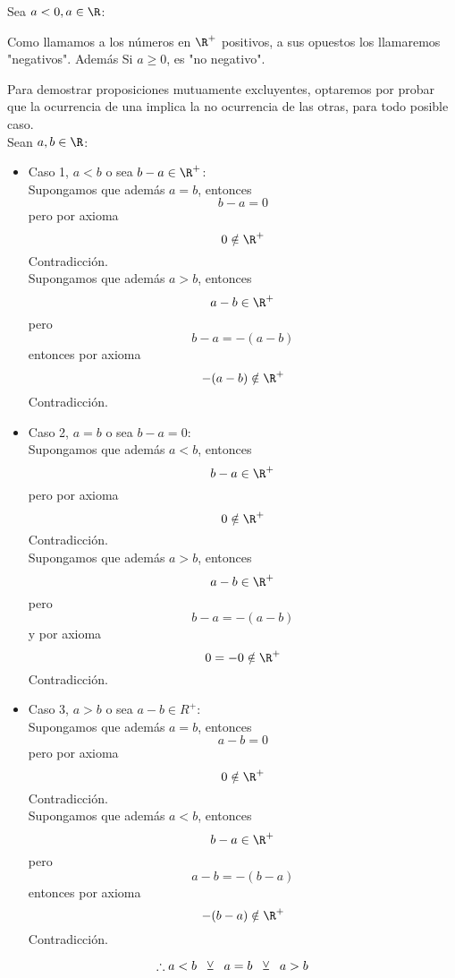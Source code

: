 \documentclass[10pt]{article}
\begin{document}
\begin{prf}[$a < 0 \Leftrightarrow -a > 0$]{}
	Sea $a < 0, a \in \R$:\\

\end{prf}

Como llamamos a los números en $\R^+$ positivos, a sus opuestos los llamaremos "negativos". Además Si $a \geq 0$, es "no negativo".

\begin{prf}{}
	Para demostrar proposiciones mutuamente excluyentes, optaremos por probar que la ocurrencia de una implica la no ocurrencia de las otras, para todo posible caso.\\
	Sean $a,b \in \R$:\\

	\begin{itemize}
		\item Caso 1, $a < b$ o sea $b - a \in \R^+$:\\
		Supongamos que además $a = b$, entonces
		$$b - a = 0$$
		pero por axioma
		$$0 \notin \R^+$$
		Contradicción.\\
		Supongamos que además $a > b$, entonces
		$$a - b \in \R^+$$
		pero
		$$b - a = -(a - b)$$
		entonces por axioma
		$$-(a - b) \notin \R^+$$
		Contradicción.\\
		\item Caso 2, $a = b$ o sea $b - a = 0$:\\
		Supongamos que además $a < b$, entonces
		$$b - a \in \R^+$$
		pero por axioma
		$$0 \notin \R^+$$
		Contradicción.\\
		Supongamos que además $a > b$, entonces
		$$a - b \in \R^+$$
		pero
		$$b - a = -(a - b)$$
		y por axioma
		$$0 = -0 \notin \R^+$$
		Contradicción.\\
		\item Caso 3, $a > b$ o sea $a - b \in R^+$:\\
		Supongamos que además $a = b$, entonces
		$$a - b = 0$$
		pero por axioma
		$$0 \notin \R^+$$
		Contradicción.\\
		Supongamos que además $a < b$, entonces
		$$b - a \in \R^+$$
		pero
		$$a - b = -(b - a)$$
		entonces por axioma
		$$-(b - a) \notin \R^+$$
		Contradicción.\\
	\end{itemize}
	$$\therefore a < b\hspace{2mm}\veebar\hspace{2mm} a = b \hspace{2mm}\veebar\hspace{2mm} a > b$$
\end{prf}
\end{document}
